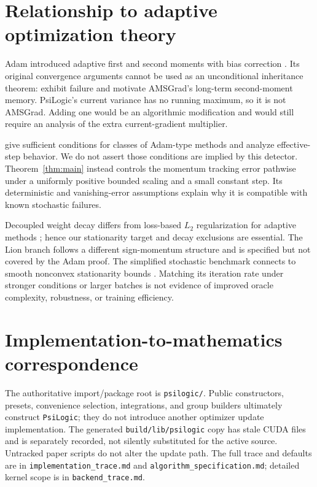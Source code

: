 \documentclass[11pt]{article}
\theoremstyle{definition}
\theoremstyle{remark}
\begin{document}
\section{Relationship to adaptive optimization theory}\label{sec:related}
Adam introduced adaptive first and second moments with bias correction
\citep{kingma2015adam}. Its original convergence arguments cannot be used as
an unconditional inheritance theorem: \citet{reddi2018convergence} exhibit
failure and motivate AMSGrad's long-term second-moment memory. PsiLogic's
current variance has no running maximum, so it is not AMSGrad. Adding one
would be an algorithmic modification and would still require an analysis of
the extra current-gradient multiplier.

\citet{chen2019adamtype} give sufficient conditions for classes of Adam-type
methods and analyze effective-step behavior. We do not assert those conditions
are implied by this detector. Theorem~\ref{thm:main} instead controls the
momentum tracking error pathwise under a uniformly positive bounded scaling
and a small constant step. Its deterministic and vanishing-error assumptions
explain why it is compatible with known stochastic failures.

Decoupled weight decay differs from loss-based $L_2$ regularization for
adaptive methods \citep{loshchilov2019decoupled}; hence our stationarity target
and decay exclusions are essential. The Lion branch follows a different
sign-momentum structure \citep{chen2023lion} and is specified but not covered
by the Adam proof. The simplified stochastic benchmark connects to smooth
nonconvex stationarity bounds \citep{ghadimi2013stochastic}. Matching its
iteration rate under stronger conditions or larger batches is not evidence
of improved oracle complexity, robustness, or training efficiency.

\section{Implementation-to-mathematics correspondence}\label{sec:trace}
The authoritative import/package root is \texttt{psilogic/}. Public
constructors, presets, convenience selection, integrations, and group builders
ultimately construct \texttt{PsiLogic}; they do not introduce another
optimizer update implementation. The generated \texttt{build/lib/psilogic}
copy has stale CUDA files and is separately recorded, not silently substituted
for the active source. Untracked paper scripts do not alter the update path.
The full trace and defaults are in \texttt{implementation\_trace.md} and
\texttt{algorithm\_specification.md}; detailed kernel scope is in
\texttt{backend\_trace.md}.
\end{document}
